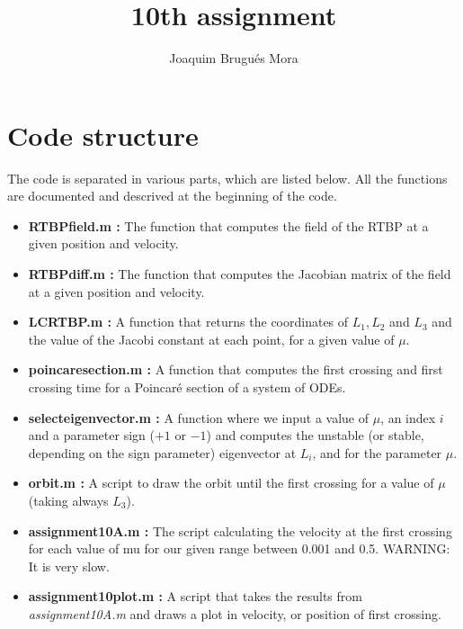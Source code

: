 \documentclass[twoside]{article}
\begin{document}
\title{10th assignment}
\author{Joaquim Brugués Mora}
\maketitle

\section{Code structure}

The code is separated in various parts, which are listed below. All the functions are documented and descrived at the beginning of the code.

\begin{itemize}
\item {\bf RTBPfield.m :} The function that computes the field of the RTBP at a given position and velocity.
\item {\bf RTBPdiff.m :} The function that computes the Jacobian matrix of the field at a given position and velocity.
\item {\bf LCRTBP.m :} A function that returns the coordinates of $L_1, L_2$ and $L_3$ and the value of the Jacobi constant at each point, for a given value of $\mu$.
\item {\bf poincare\textunderscore section.m :} A function that computes the first crossing and first crossing time for a Poincaré section of a system of ODEs.
\item {\bf select\textunderscore eigenvector.m :} A function where we input a value of $\mu$, an index $i$ and a parameter sign ($+1$ or $-1$) and computes the unstable (or stable, depending on the sign parameter) eigenvector at $L_i$, and for the parameter $\mu$.
\item {\bf orbit.m :} A script to draw the orbit until the first crossing for a value of $\mu$ (taking always $L_3$).
\item {\bf assignment10A.m :} The script calculating the velocity at the first crossing for each value of mu for our given range between 0.001 and 0.5. WARNING: It is very slow.
\item {\bf assignment10plot.m :} A script that takes the results from {\it assignment10A.m} and draws a plot in velocity, or position of first crossing.
\end{itemize}
\end{document}
